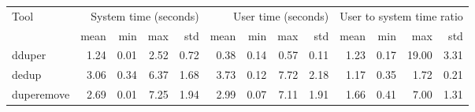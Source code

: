 \begin{tabular}{lrrrrrrrrrrrr}
\toprule
Tool & \multicolumn{4}{r}{System time (seconds)} & \multicolumn{4}{r}{User time (seconds)} & \multicolumn{4}{r}{User to system time ratio} \\
 & mean & min & max & std & mean & min & max & std & mean & min & max & std \\
\midrule
dduper & 1.24 & 0.01 & 2.52 & 0.72 & 0.38 & 0.14 & 0.57 & 0.11 & 1.23 & 0.17 & 19.00 & 3.31 \\
dedup & 3.06 & 0.34 & 6.37 & 1.68 & 3.73 & 0.12 & 7.72 & 2.18 & 1.17 & 0.35 & 1.72 & 0.21 \\
duperemove & 2.69 & 0.01 & 7.25 & 1.94 & 2.99 & 0.07 & 7.11 & 1.91 & 1.66 & 0.41 & 7.00 & 1.31 \\
\bottomrule
\end{tabular}
